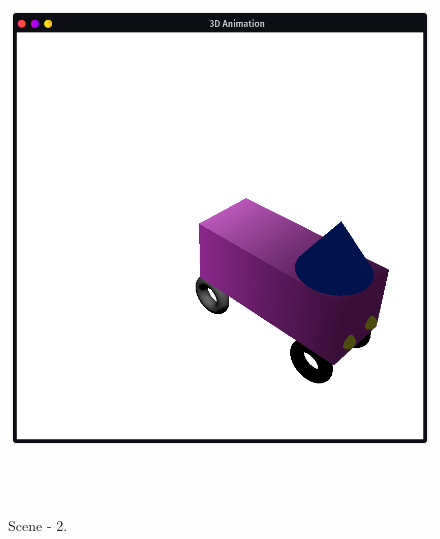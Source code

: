 \documentclass[12pt, a4]{article}
\begin{document}
\subsection*{}
\begin{figure}[h]
\centering
\caption{Scene - 2.}
\includegraphics[height=15cm, width=15cm]{Outputs/Animation-1.png}
\end{figure}

\newpage
\end{document}

